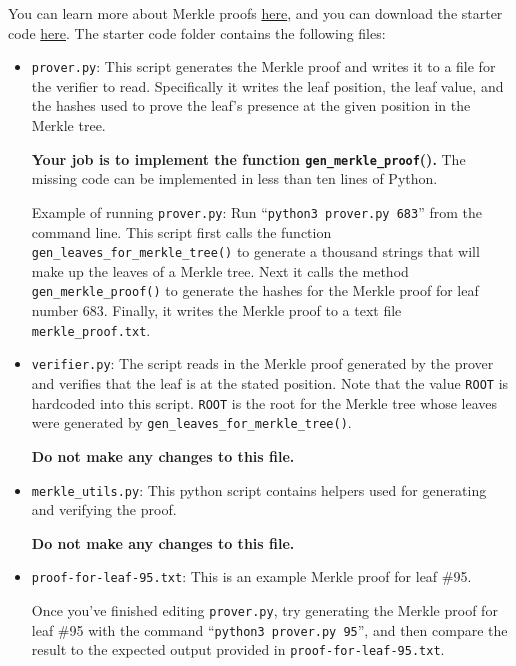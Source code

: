 \documentclass[11pt]{article}
\numberwithin{equation}{section}
\begin{document}
\noindent You can learn more about Merkle proofs \href{https://decentralizedthoughts.github.io/2020-12-22-what-is-a-merkle-tree/}{here}, and you can download the starter code \href{https://eecs171.com/assets/homework/hw9.zip}{here}. The starter code folder contains the following files:
\begin{itemize}
    \item \texttt{prover.py}: This script generates the Merkle proof and writes it to a file for the verifier to read. Specifically it writes the leaf position, the leaf value, and the hashes used to prove the leaf’s presence at the given position in the Merkle tree.

    \textbf{Your job is to implement the function \texttt{gen\_merkle\_proof}().} The missing code can be implemented in less than ten lines of Python.

    Example of running \texttt{prover.py}: Run ``\texttt{python3 prover.py 683}'' from the command line. This script first calls the function \texttt{gen\_leaves\_for\_merkle\_tree()} to generate a thousand strings that will make up the leaves of a Merkle tree. Next it calls the method \texttt{gen\_merkle\_proof()} to generate the hashes for the Merkle proof for leaf number 683. Finally, it writes the Merkle proof to a text file \texttt{merkle\_proof.txt}.

    \item \texttt{verifier.py}: The script reads in the Merkle proof generated by the prover and verifies that the leaf is at the stated position. Note that the value \texttt{ROOT} is hardcoded into this script. \texttt{ROOT} is the root for the Merkle tree whose leaves were generated by \texttt{gen\_leaves\_for\_merkle\_tree()}.
    
    \textbf{Do not make any changes to this file.} 
    
    \item \texttt{merkle\_utils.py}: This python script contains helpers used for generating and verifying the proof. 
    
    \textbf{Do not make any changes to this file.}

    \item \texttt{proof-for-leaf-95.txt}: This is an example Merkle proof for leaf \#95. 
    
    Once you've finished editing \texttt{prover.py}, try generating the Merkle proof for leaf \#95 with the command ``\texttt{python3 prover.py 95}'', and then compare the result to the expected output provided in \texttt{proof-for-leaf-95.txt}.
\end{itemize}
\end{document}
